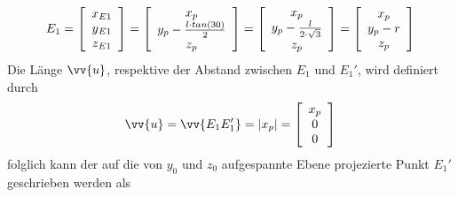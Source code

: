 \documentclass[Bachelor, BMR, ngerman]{twbook}
\begin{document}
    \begin{align}
        E_1 = 
            \left[
                \begin{array}{c} 
                    x\textsubscript{$E1$}\\
                    y\textsubscript{$E1$}\\
                    z\textsubscript{$E1$} 
                \end{array}
            \right] =
            \left[
                \begin{array}{c} 
                    x_p\\
                    y_p - \frac{l \cdot tan(30)}{2}\\
                    z_p 
                \end{array}
            \right] =
            \left[
                \begin{array}{c} 
                    x_p\\
                    y_p - \frac{l}{2 \cdot \sqrt{3}}\\
                    z_p 
                \end{array}
            \right] =
            \left[
                \begin{array}{c} 
                    x_p\\
                    y_p - r\\
                    z_p 
                \end{array}
            \right]
        \label{eq:E1}
    \end{align}
    \noindent
    Die Länge $\vv{u}$, respektive der Abstand zwischen $E_1$ und $E_1'$, wird definiert durch
    \newline
    \begin{align}
        \vv{u} = \vv{E_1E_1'} = \vert x_p \vert = 
            \left[
                \begin{array}{c} 
                    x_p\\
                    0\\
                    0 
                \end{array}
            \right]
        \label{eq:u}
    \end{align}
    \noindent
    folglich kann der auf die von $y_0$ und $z_0$ aufgespannte Ebene projezierte Punkt $E_1'$ geschrieben werden als
\end{document}
